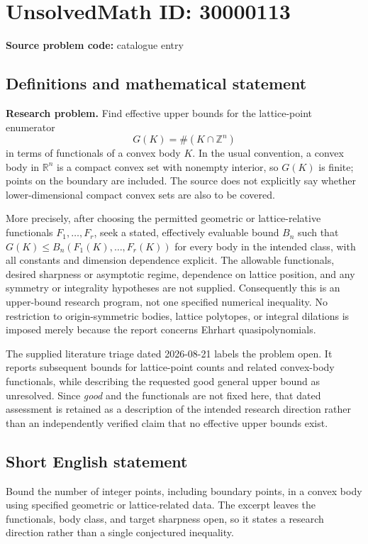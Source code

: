 \documentclass[11pt]{article}
\newcommand{\Z}{\mathbb{Z}}
\newcommand{\R}{\mathbb{R}}
\begin{document}
\section*{UnsolvedMath ID: 30000113}
\textbf{Source problem code:} catalogue entry
\subsection{Definitions and mathematical statement}
\textbf{Research problem.} Find effective upper bounds for the lattice-point enumerator\[G(K)=\#(K\cap\Z^n)\] in terms of functionals of a convex body \(K\). In the usual convention, a convex body in \(\R^n\) is a compact convex set with nonempty interior, so \(G(K)\) is finite; points on the boundary are included. The source does not explicitly say whether lower-dimensional compact convex sets are also to be covered.\par More precisely, after choosing the permitted geometric or lattice-relative functionals \(F_1,\ldots,F_r\), seek a stated, effectively evaluable bound \(B_n\) such that \(G(K)\le B_n(F_1(K),\ldots,F_r(K))\) for every body in the intended class, with all constants and dimension dependence explicit. The allowable functionals, desired sharpness or asymptotic regime, dependence on lattice position, and any symmetry or integrality hypotheses are not supplied. Consequently this is an upper-bound research program, not one specified numerical inequality. No restriction to origin-symmetric bodies, lattice polytopes, or integral dilations is imposed merely because the report concerns Ehrhart quasipolynomials.\par The supplied literature triage dated 2026-08-21 labels the problem open. It reports subsequent bounds for lattice-point counts and related convex-body functionals, while describing the requested good general upper bound as unresolved. Since \emph{good} and the functionals are not fixed here, that dated assessment is retained as a description of the intended research direction rather than an independently verified claim that no effective upper bounds exist.
\subsection{Short English statement}
Bound the number of integer points, including boundary points, in a convex body using specified geometric or lattice-related data. The excerpt leaves the functionals, body class, and target sharpness open, so it states a research direction rather than a single conjectured inequality.
\end{document}
